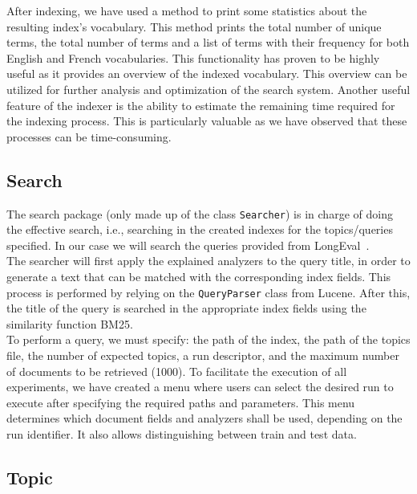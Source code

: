 After indexing, we have used a method to print some statistics about the resulting index's vocabulary.
This method prints the total number of unique terms, the total number of terms and a list of terms with their frequency
for both English and French vocabularies.
This functionality has proven to be highly useful as it provides an overview of the indexed vocabulary.
This overview can be utilized for further analysis and optimization of the search system.
Another useful feature of the indexer is the ability to estimate the remaining time required for the indexing process.
This is particularly valuable as we have observed that these processes can be time-consuming.\\

\subsection{Search}\label{subsec:search}
The search package (only made up of the class \texttt{Searcher}) is in charge of doing the effective search, i.e.,
searching in the created indexes for the topics/queries specified.
In our case we will search the queries provided from LongEval~\cite{traindata}.\\

The searcher will first apply the explained analyzers to the query title, in order to generate a text that can be
matched with the corresponding index fields.
This process is performed by relying on the \texttt{QueryParser} class from Lucene.
After this, the title of the query is searched in the appropriate index fields using the similarity function
BM25.\\

To perform a query, we must specify: the path of the index, the path of the topics file, the number of expected topics,
a run descriptor, and the maximum number of documents to be retrieved (1000).
To facilitate the execution of all experiments, we have created a menu where users can select the desired run to execute
after specifying the required paths and parameters.
This menu determines which document fields and analyzers shall be used, depending on the run identifier.
It also allows distinguishing between train and test data.\\

\subsection{Topic}\label{subsec:topic}

